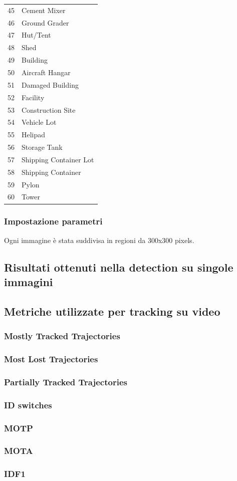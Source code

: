 \begin{center}
\begin{longtable}{|c|l|}
45 & Cement Mixer \\
46 & Ground Grader \\
47 & Hut/Tent \\
48 & Shed \\
49 & Building \\
50 & Aircraft Hangar \\
51 & Damaged Building \\
52 & Facility \\
53 & Construction Site \\
54 & Vehicle Lot \\
55 & Helipad \\
56 & Storage Tank \\
57 & Shipping Container Lot \\
58 & Shipping Container \\
59 & Pylon \\
60 & Tower \\
\end{longtable}
\end{center}

\subsubsection{Impostazione parametri}
Ogni immagine è stata suddivisa in regioni da 300x300 pixels.

\subsection{Risultati ottenuti nella detection su singole immagini}

\subsection{Metriche utilizzate per tracking su video}
\subsubsection{Mostly Tracked Trajectories}
\subsubsection{Most Lost Trajectories}
\subsubsection{Partially Tracked Trajectories}
\subsubsection{ID switches}
\subsubsection{MOTP}
\subsubsection{MOTA}
\subsubsection{IDF1}




